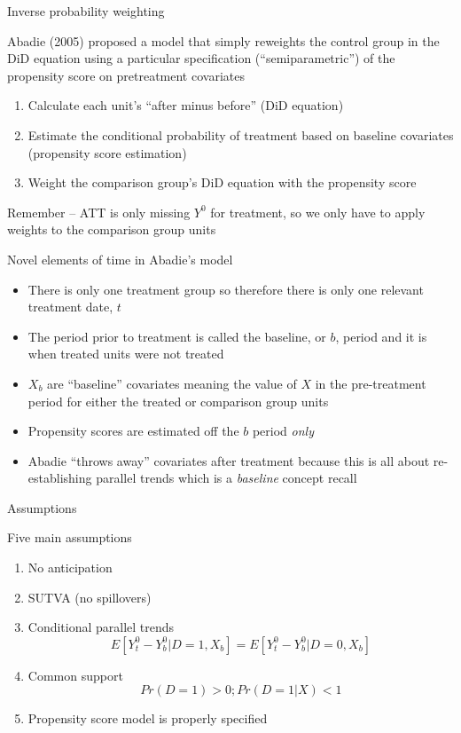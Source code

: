 \documentclass{beamer}
\begin{document}
\begin{frame}{Inverse probability weighting}


 Abadie (2005) proposed a model that simply reweights the control group in the DiD equation using a particular specification (``semiparametric'') of the propensity score on pretreatment covariates
 
	\begin{enumerate}
	\item Calculate each unit's ``after minus before'' (DiD equation)
	\item Estimate the conditional probability of treatment based on baseline covariates (propensity score estimation)
	\item Weight the comparison group's DiD equation with the propensity score 
	\end{enumerate}

Remember -- ATT is only missing $Y^0$ for treatment, so we only have to apply weights to the comparison group units

\end{frame}

\begin{frame}{Novel elements of time in Abadie's model}

\begin{itemize}
\item There is only one treatment group so therefore there is only one relevant treatment date, $t$
\item The period prior to treatment is called the baseline, or $b$, period and it is when treated units were not treated 
\item $X_b$ are ``baseline'' covariates meaning the value of $X$ in the pre-treatment period for either the treated or comparison group units
\item Propensity scores are estimated off the $b$ period \emph{only} 
\item Abadie ``throws away'' covariates after treatment because this is all about re-establishing parallel trends which is a \emph{baseline} concept recall
\end{itemize}

\end{frame}

\begin{frame}{Assumptions}

Five main assumptions

\begin{enumerate}
\item No anticipation 
\item SUTVA (no spillovers)
\item Conditional parallel trends $$E[Y^0_t - Y^0_b|D=1,X_b] = E[Y^0_t - Y^0_b | D=0, X_b]$$ 
\item Common support $$Pr(D=1)>0; Pr(D=1|X)<1$$ 
\item Propensity score model is properly specified 
\end{enumerate}

\end{frame}
\end{document}
